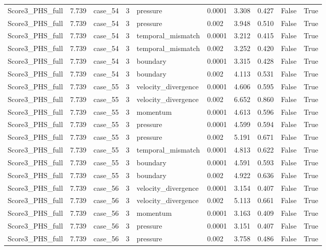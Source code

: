 \begin{longtable}{llllllllll}
Score3\_PHS\_full & 7.739 & case\_54 & 3 & pressure & 0.0001 & 3.308 & 0.427 & False & True \\
Score3\_PHS\_full & 7.739 & case\_54 & 3 & pressure & 0.002 & 3.948 & 0.510 & False & True \\
Score3\_PHS\_full & 7.739 & case\_54 & 3 & temporal\_mismatch & 0.0001 & 3.212 & 0.415 & False & True \\
Score3\_PHS\_full & 7.739 & case\_54 & 3 & temporal\_mismatch & 0.002 & 3.252 & 0.420 & False & True \\
Score3\_PHS\_full & 7.739 & case\_54 & 3 & boundary & 0.0001 & 3.315 & 0.428 & False & True \\
Score3\_PHS\_full & 7.739 & case\_54 & 3 & boundary & 0.002 & 4.113 & 0.531 & False & True \\
Score3\_PHS\_full & 7.739 & case\_55 & 3 & velocity\_divergence & 0.0001 & 4.606 & 0.595 & False & True \\
Score3\_PHS\_full & 7.739 & case\_55 & 3 & velocity\_divergence & 0.002 & 6.652 & 0.860 & False & True \\
Score3\_PHS\_full & 7.739 & case\_55 & 3 & momentum & 0.0001 & 4.613 & 0.596 & False & True \\
Score3\_PHS\_full & 7.739 & case\_55 & 3 & pressure & 0.0001 & 4.599 & 0.594 & False & True \\
Score3\_PHS\_full & 7.739 & case\_55 & 3 & pressure & 0.002 & 5.191 & 0.671 & False & True \\
Score3\_PHS\_full & 7.739 & case\_55 & 3 & temporal\_mismatch & 0.0001 & 4.813 & 0.622 & False & True \\
Score3\_PHS\_full & 7.739 & case\_55 & 3 & boundary & 0.0001 & 4.591 & 0.593 & False & True \\
Score3\_PHS\_full & 7.739 & case\_55 & 3 & boundary & 0.002 & 4.922 & 0.636 & False & True \\
Score3\_PHS\_full & 7.739 & case\_56 & 3 & velocity\_divergence & 0.0001 & 3.154 & 0.407 & False & True \\
Score3\_PHS\_full & 7.739 & case\_56 & 3 & velocity\_divergence & 0.002 & 5.113 & 0.661 & False & True \\
Score3\_PHS\_full & 7.739 & case\_56 & 3 & momentum & 0.0001 & 3.163 & 0.409 & False & True \\
Score3\_PHS\_full & 7.739 & case\_56 & 3 & pressure & 0.0001 & 3.151 & 0.407 & False & True \\
Score3\_PHS\_full & 7.739 & case\_56 & 3 & pressure & 0.002 & 3.758 & 0.486 & False & True \\

\end{longtable}
